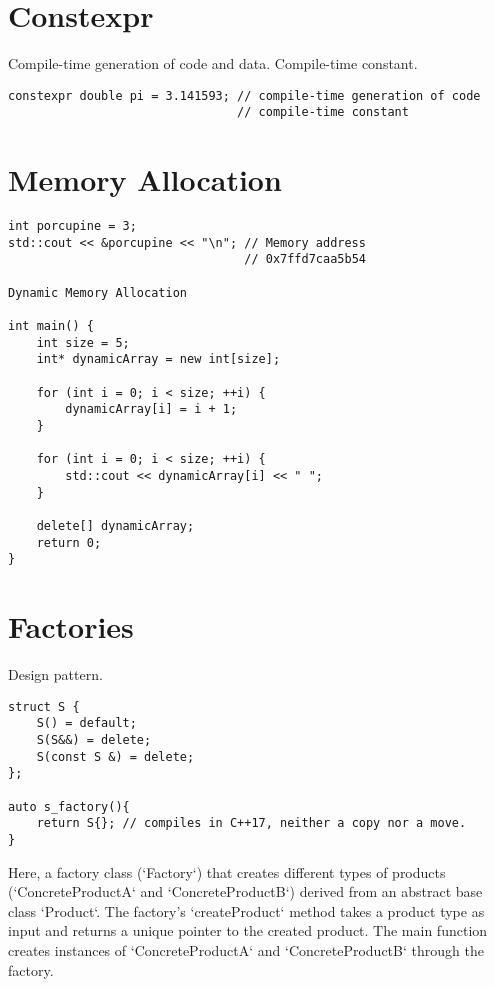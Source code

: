 \section{Constexpr}

Compile-time generation of code and data. Compile-time constant.

\begin{verbatim}
constexpr double pi = 3.141593; // compile-time generation of code
                                // compile-time constant
\end{verbatim}

\section{Memory Allocation}

\begin{verbatim}
int porcupine = 3;
std::cout << &porcupine << "\n"; // Memory address
                                 // 0x7ffd7caa5b54

Dynamic Memory Allocation

int main() {
    int size = 5;
    int* dynamicArray = new int[size];

    for (int i = 0; i < size; ++i) {
        dynamicArray[i] = i + 1;
    }

    for (int i = 0; i < size; ++i) {
        std::cout << dynamicArray[i] << " ";
    }

    delete[] dynamicArray;
    return 0;
}
\end{verbatim}

\section{Factories}

Design pattern.

\begin{verbatim}
struct S {
    S() = default;
    S(S&&) = delete;
    S(const S &) = delete;
};

auto s_factory(){
    return S{}; // compiles in C++17, neither a copy nor a move.
}
\end{verbatim}

Here, a factory class (`Factory`) that creates different types of products
(`ConcreteProductA` and `ConcreteProductB`) derived from an abstract base class `Product`.
The factory's `createProduct` method takes a product type as input and returns a unique pointer to the created product.
The main function creates instances of `ConcreteProductA` and `ConcreteProductB` through the factory.

